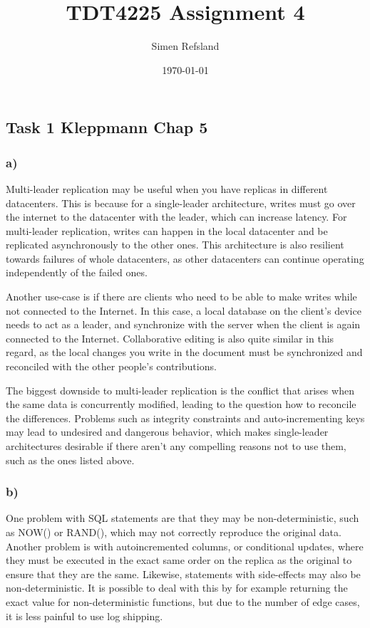 \documentclass[12pt, titlepage]{report}
\title{TDT4225 Assignment 4}
\author{Simen Refsland}
\date{\today}
\begin{document}
\maketitle
\pagestyle{fancy}
\newpage
\subsection*{Task 1 Kleppmann Chap 5}
\subsubsection{a)}
Multi-leader replication may be useful when you have replicas in different datacenters. This is because for a single-leader architecture, writes must go over the internet to the datacenter with the leader, which can increase latency. For multi-leader replication, writes can happen in the local datacenter and be replicated asynchronously to the other ones. This architecture is also resilient towards failures of whole datacenters, as other datacenters can continue operating independently of the failed ones.

Another use-case is if there are clients who need to be able to make writes while not connected to the Internet. In this case, a local database on the client's device needs to act as a leader, and synchronize with the server when the client is again connected to the Internet. Collaborative editing is also quite similar in this regard, as the local changes you write in the document must be synchronized and reconciled with the other people's contributions.

The biggest downside to multi-leader replication is the conflict that arises when the same data is concurrently modified, leading to the question how to reconcile the differences. Problems such as integrity constraints and auto-incrementing keys may lead to undesired and dangerous behavior, which makes single-leader architectures desirable if there aren't any compelling reasons not to use them, such as the ones listed above.
\subsubsection{b)}
One problem with SQL statements are that they may be non-deterministic, such as NOW() or RAND(), which may not correctly reproduce the original data. Another problem is with autoincremented columns, or conditional updates, where they must be executed in the exact same order on the replica as the original to ensure that they are the same. Likewise, statements with side-effects may also be non-deterministic. It is possible to deal with this by for example returning the exact value for non-deterministic functions, but due to the number of edge cases, it is less painful to use log shipping.
\end{document}
